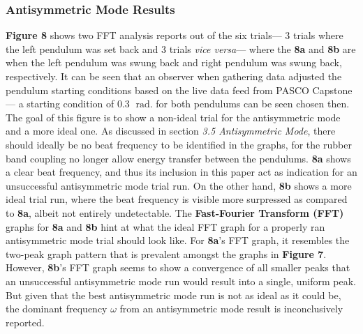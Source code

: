 \documentclass[12pt]{article}
\newcommand{\radian}{\;\mathrm{rad.}}
\begin{document}
\begin{multicols}{2}
\subsubsection{Antisymmetric Mode Results}
\textbf{Figure 8} shows two FFT analysis reports out of the six trials--- 3 trials where the left pendulum was set back and 3 trials \textit{vice versa}---
where the  \textbf{8a} and \textbf{8b} are when the left pendulum was swung back and right pendulum was swung back, respectively.
It can be seen that an observer when gathering data adjusted the pendulum starting conditions based on the live data feed from PASCO Capstone---
a starting condition of 0.3 $\radian$ for both pendulums can be seen chosen then.
The goal of this figure is to show a non-ideal trial for the antisymmetric mode and a more ideal one.
As discussed in section \textit{3.5 Antisymmetric Mode}, there should ideally be no beat frequency to be identified in the graphs, for the rubber band coupling no longer allow energy transfer between the pendulums.
\textbf{8a} shows a clear beat frequency, and thus its inclusion in this paper act as indication for an unsuccessful antisymmetric mode trial run.
On the other hand, \textbf{8b} shows a more ideal trial run, where the beat frequency is visible more surpressed as compared to \textbf{8a}, albeit not entirely undetectable.
The \textbf{Fast-Fourier Transform (FFT)} graphs for \textbf{8a} and \textbf{8b} hint at what the ideal FFT graph for a properly ran antisymmetric mode trial should look like.
For \textbf{8a}'s FFT graph, it resembles the two-peak graph pattern that is prevalent amongst the graphs in \textbf{Figure 7}.
However, \textbf{8b}'s FFT graph seems to show a convergence of all smaller peaks that an unsuccessful antisymmetric mode run would result into a single, uniform peak.
But given that the best antisymmetric mode run is not as ideal as it could be, the dominant frequency $\omega$ from an antisymmetric mode result is inconclusively reported.
\vfill

\end{multicols}
\newpage
\end{document}
